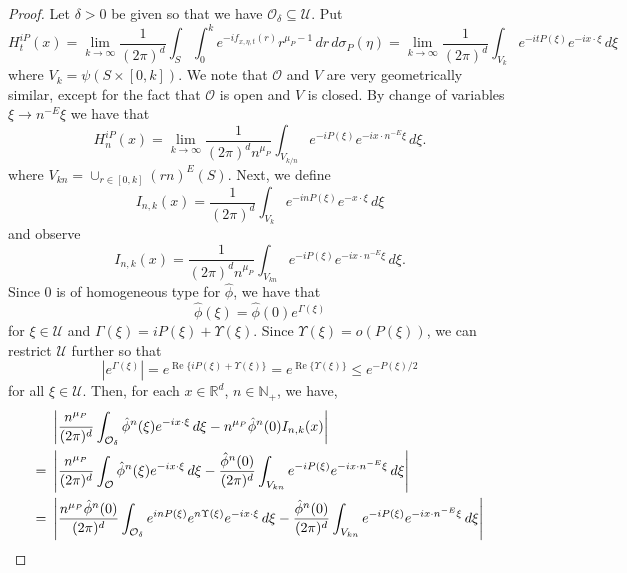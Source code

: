 \documentclass[11pt]{article}
\renewcommand\Re{\operatorname{Re}}%
\newcommand\R{\mathbb{R}}
\newcommand{\f}[2]{\frac{#1}{#2}}
\begin{document}
\begin{proof}
Let $\delta > 0$ be given so that we have $\mathcal{O}_\delta \subseteq \mathcal{U}$. Put
\begin{equation*}
    H^{iP}_{t}(x) = \lim_{k\to \infty}\f{1}{(2\pi)^{d}}\int_S  \int_0^k e^{-if_{x,\eta,t}(r)} r^{\mu_P - 1}\,dr\,d\sigma_P(\eta) = \lim_{k\to \infty} \f{1}{(2\pi)^{d}}\int_{V_k} e^{-itP(\xi)}e^{-ix\cdot \xi}\,d\xi
\end{equation*}
where $V_k = \psi(S\times [0,k])$. We note that $\mathcal{O}$ and $V$ are very geometrically similar, except for the fact that $\mathcal{O}$ is open and $V$ is closed. By change of variables $\xi \to n^{-E}\xi$ we have that
\begin{equation*}
    H^{iP}_{n}(x) = \lim_{k\to \infty} \f{1}{(2\pi)^{d} n^{\mu_P}}\int_{V_{k/n}} e^{-iP(\xi)}e^{-ix\cdot n^{-E}\xi}\,d\xi.
\end{equation*}
where $V_{kn} = \cup_{r\in [0,k]}(rn)^E(S)$. Next, we define
\begin{equation*}
    I_{n,k}(x)=\frac{1}{(2\pi)^d}\int_{V_k}e^{-inP(\xi)}e^{-x\cdot \xi}\,d\xi
\end{equation*}
and observe
\begin{equation*}
    I_{n,k}(x)=\frac{1}{(2\pi)^dn^{\mu_P}}\int_{V_{kn}}e^{-iP(\xi)}e^{-ix\cdot n^{-E} \xi}\,d\xi.
\end{equation*}
Since $0$ is of homogeneous type for $\hat{\phi}$, we have that
\begin{equation*}
    \hat{\phi}(\xi) = \hat{\phi}(0)e^{\Gamma(\xi)}
\end{equation*}
for $\xi\in \mathcal{U}$ and $\Gamma(\xi) = iP(\xi) + \Upsilon(\xi)$. Since $\Upsilon(\xi) = o(P(\xi))$, we can restrict $\mathcal{U}$ further so that 
\begin{equation*}
    |e^{\Gamma(\xi)}| = e^{\Re\{ iP(\xi) + \Upsilon(\xi) \}} =  e^{\Re\{  \Upsilon(\xi) \}}\leq e^{-P(\xi)/2}
\end{equation*}
for all $\xi \in \mathcal{U}$. Then, for each $x\in \R^d$, $n\in \mathbb{N}_+$, we have,
\begin{align*}
    &\abs {    \frac{n^{\mu_P}}{(2\pi)^d}\int_{\mathcal{O}_\delta} \hat{\phi}^n(\xi) e^{-i x\cdot \xi} \,d\xi - n^{\mu_P}  \hat{\phi}^n(0) I_{n,k}(x) } \\
    =\,\,\, &\abs {\frac{n^{\mu_P}}{(2\pi)^d}\int_{\mathcal{O}} \hat{\phi}^n(\xi) e^{-i x\cdot \xi} \,d\xi - \f{\hat{\phi}^n(0)}{(2\pi)^d}  \int_{V_{kn}}e^{-iP(\xi)}e^{-ix\cdot n^{-E} \xi}\,d\xi } \\
    =\,\,\, &\abs{\f{n^{\mu_P} \hat{\phi}^n(0)}{(2\pi)^d} \int_{\mathcal{O}_\delta} e^{inP(\xi)} e^{n\Upsilon(\xi)} e^{-i x\cdot \xi} \,d\xi - \f{\hat{\phi}^n(0)}{(2\pi)^d}  \int_{V_{kn}}e^{-iP(\xi)}e^{-ix\cdot n^{-E} \xi}\,d\xi } \\

\end{align*}
\end{proof}
\end{document}
